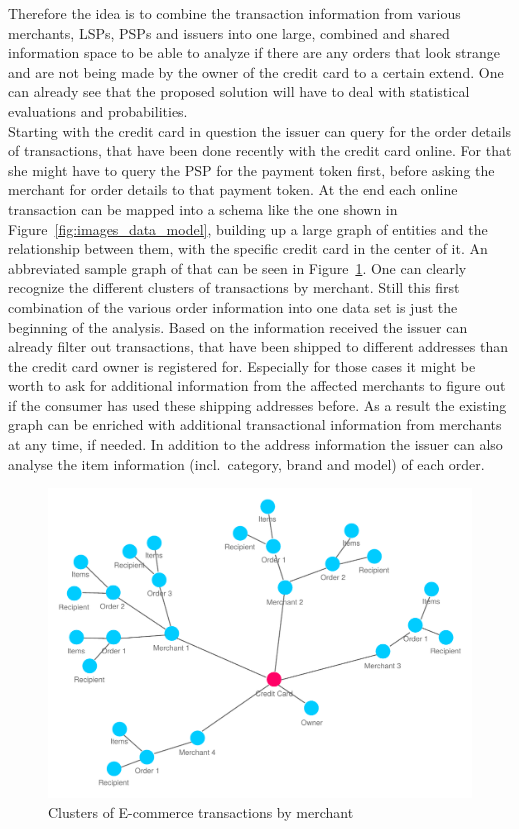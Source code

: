 Therefore the idea is to combine the transaction information from various merchants, \gls{LSP}s, \gls{PSP}s and issuers into one large, combined and shared information space to be able to analyze if there are any orders that look strange and are not being made by the owner of the credit card to a certain extend. One can already see that the proposed solution will have to deal with statistical evaluations and probabilities. \\

Starting with the credit card in question the issuer can query for the order details of transactions, that have been done recently with the credit card online. For that she might have to query the \gls{PSP} for the payment token first, before asking the merchant for order details to that payment token. At the end each online transaction can be mapped into a schema like the one shown in Figure~\ref{fig:images_data_model}, building up a large graph of entities and  the relationship between them, with the specific credit card in the center of it. An abbreviated sample graph of that can be seen in Figure~\ref{fig:images_credit_card_graph}. One can clearly recognize the different clusters of transactions by merchant. Still this first combination of the various order information into one data set is just the beginning of the analysis. Based on the information received the issuer can already filter out transactions, that have been shipped to different addresses than the credit card owner is registered for. Especially for those cases it might be worth to ask for additional information from the affected merchants to figure out if the consumer has used these shipping addresses before. As a result the existing graph can be enriched with additional transactional information from merchants at any time, if needed. In addition to the address information the issuer can also analyse the item information (incl.\ category, brand and model) of each order. \\

\begin{figure}[!ht]
  \centering
  \includegraphics[width=0.9\columnwidth]{images/ontology_scenario_2.pdf}
  \caption{Clusters of E-commerce transactions by merchant}
\label{fig:images_credit_card_graph}
\end{figure}

